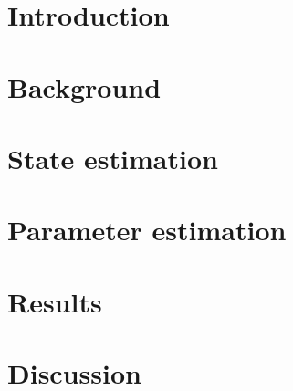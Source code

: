 \documentclass[english,12pt]{article}
\begin{document}

\makecoverpage



%


\tableofcontents

%


\cleardoublepage
\storeinipagenumber
{}
\setcounter{page}{1}


\section{Introduction}



\thispagestyle{empty}


\clearpage

\section{Background}




\section{State estimation}


\section{Parameter estimation}



\section{Results}


\section{Discussion}


	
\clearpage
\listoftodos
\printbibliography
\clearpage
\appendix
\end{document}
